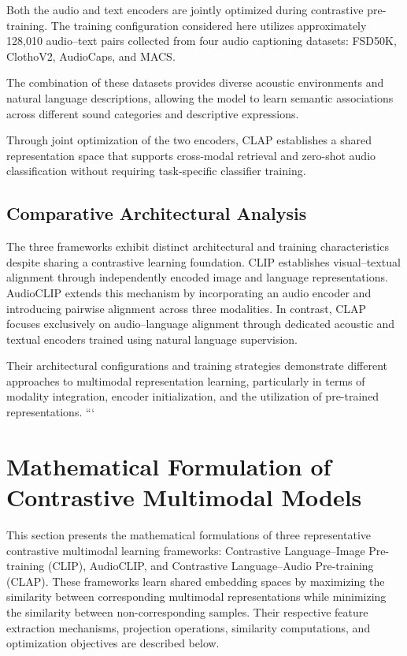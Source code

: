 \documentclass[pdflatex,sn-mathphys-num]{sn-jnl}%
\theoremstyle{thmstyleone}%
\theoremstyle{thmstyletwo}%
\theoremstyle{thmstylethree}%
\begin{document}
Both the audio and text encoders are jointly optimized during contrastive pre-training. The training configuration considered here utilizes approximately 128,010 audio--text pairs collected from four audio captioning datasets: FSD50K, ClothoV2, AudioCaps, and MACS.

The combination of these datasets provides diverse acoustic environments and natural language descriptions, allowing the model to learn semantic associations across different sound categories and descriptive expressions.

Through joint optimization of the two encoders, CLAP establishes a shared representation space that supports cross-modal retrieval and zero-shot audio classification without requiring task-specific classifier training.

\subsection{Comparative Architectural Analysis}

The three frameworks exhibit distinct architectural and training characteristics despite sharing a contrastive learning foundation. CLIP establishes visual--textual alignment through independently encoded image and language representations. AudioCLIP extends this mechanism by incorporating an audio encoder and introducing pairwise alignment across three modalities. In contrast, CLAP focuses exclusively on audio--language alignment through dedicated acoustic and textual encoders trained using natural language supervision.

Their architectural configurations and training strategies demonstrate different approaches to multimodal representation learning, particularly in terms of modality integration, encoder initialization, and the utilization of pre-trained representations.
```

\section{Mathematical Formulation of Contrastive Multimodal Models}\label{sec4}

This section presents the mathematical formulations of three representative contrastive multimodal learning frameworks: Contrastive Language--Image Pre-training (CLIP), AudioCLIP, and Contrastive Language--Audio Pre-training (CLAP). These frameworks learn shared embedding spaces by maximizing the similarity between corresponding multimodal representations while minimizing the similarity between non-corresponding samples. Their respective feature extraction mechanisms, projection operations, similarity computations, and optimization objectives are described below.
\end{document}
